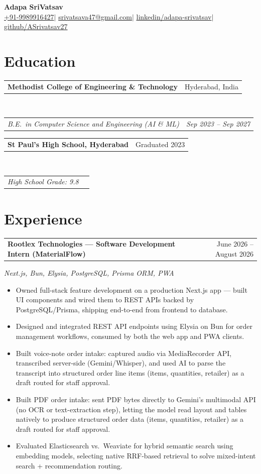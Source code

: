 \documentclass[10pt,a4paper]{article}
\makeatletter
\newcommand{\entry}[2]{%
  \noindent
  \begin{tabular*}{\textwidth}{@{}l@{\extracolsep{\fill}}r@{}}
    \textbf{#1} & \small #2
  \end{tabular*}}
\newcommand{\subentry}[2]{%
  \noindent
  \begin{tabular*}{\textwidth}{@{}l@{\extracolsep{\fill}}r@{}}
    \textit{\small #1} & \textit{\small #2}
  \end{tabular*}}
\newcommand{\techstack}[1]{%
  \noindent\textit{\small\color{black!70}#1}\par\vspace{0pt}}
\newenvironment{projitems}{%
  \begin{itemize}[leftmargin=1.1em, itemsep=0pt, topsep=0.5pt, parsep=0pt]
    \small
}{%
  \end{itemize}}
\makeatother
\begin{document}
\begin{center}
  {\huge\bfseries Adapa SriVatsav}\\[1pt]
  \small\color{linkblue}
  \href{tel:+919989916427}{+91-9989916427}\enspace$|$\enspace
  \href{mailto:srivatsava47@gmail.com}{srivatsava47@gmail.com}\enspace$|$\enspace
  \href{https://www.linkedin.com/in/adapa-srivatsav-7318b827a}{linkedin/adapa-srivatsav}\enspace$|$\enspace
  \href{https://github.com/ASrivatsav27}{github/ASrivatsav27}
\end{center}

\vspace{0pt}

\section{Education}

\entry{Methodist College of Engineering \& Technology}{Hyderabad, India}\\[1pt]
\subentry{B.E.\ in Computer Science and Engineering (AI \& ML)}{Sep 2023 -- Sep 2027}

\vspace{0pt}
\entry{St Paul's High School, Hyderabad}{Graduated 2023}\\[1pt]
\subentry{High School \quad Grade: 9.8}{}

\section{Experience}

\entry{Rootlex Technologies --- Software Development Intern (MaterialFlow)}{June 2026 -- August 2026}
\techstack{Next.js, Bun, Elysia, PostgreSQL, Prisma ORM, PWA}
\begin{projitems}
  \item Owned full-stack feature development on a production Next.js app --- built UI components and wired them to REST APIs backed by PostgreSQL/Prisma, shipping end-to-end from frontend to database.
  \item Designed and integrated REST API endpoints using Elysia on Bun for order management workflows, consumed by both the web app and PWA clients.
  \item Built voice-note order intake: captured audio via MediaRecorder API, transcribed server-side (Gemini/Whisper), and used AI to parse the transcript into structured order line items (items, quantities, retailer) as a draft routed for staff approval.
  \item Built PDF order intake: sent PDF bytes directly to Gemini's multimodal API (no OCR or text-extraction step), letting the model read layout and tables natively to produce structured order data (items, quantities, retailer) as a draft routed for staff approval.
  \item Evaluated Elasticsearch vs.\ Weaviate for hybrid semantic search using embedding models, selecting native RRF-based retrieval to solve mixed-intent search + recommendation routing.
\end{projitems}
\end{document}
